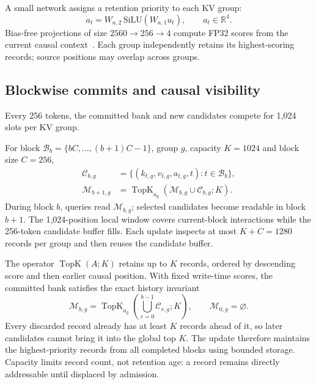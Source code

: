 A small network assigns a retention priority to each KV group:
\begin{equation}
a_t = W_{a,2}\,\mathrm{SiLU}(W_{a,1}u_t),\qquad a_t\in\mathbb R^4.
\end{equation}
Bias-free projections of size $2560\!\rightarrow\!256\!\rightarrow\!4$ compute FP32 scores from the current causal context~\cite{yanchorcode,yanchorconfig}. Each group independently retains its highest-scoring records; source positions may overlap across groups.

\subsection{Blockwise commits and causal visibility}

Every 256 tokens, the committed bank and new candidates compete for 1,024 slots per KV group.

For block $\mathcal B_b=\{bC,\ldots,(b+1)C-1\}$, group $g$, capacity $K=1024$ and block size $C=256$,
\begin{align}
\mathcal C_{b,g}&=\{(k_{t,g},v_{t,g},a_{t,g},t):t\in\mathcal B_b\},\\
\mathcal M_{b+1,g}&=\operatorname{TopK}_{a_g}(\mathcal M_{b,g}\cup\mathcal C_{b,g};K).
\end{align}
During block $b$, queries read $\mathcal M_{b,g}$; selected candidates become readable in block $b+1$. The 1,024-position local window covers current-block interactions while the 256-token candidate buffer fills. Each update inspects at most $K+C=1280$ records per group and then reuses the candidate buffer.

The operator $\operatorname{TopK}(A;K)$ retains up to $K$ records, ordered by descending score and then earlier causal position. With fixed write-time scores, the committed bank satisfies the exact history invariant
\begin{equation}
\mathcal M_{b,g}=\operatorname{TopK}_{a_g}\!\left(\bigcup_{r=0}^{b-1}\mathcal C_{r,g};K\right),
\qquad \mathcal M_{0,g}=\varnothing.
\label{eq:history-topk}
\end{equation}
Every discarded record already has at least $K$ records ahead of it, so later candidates cannot bring it into the global top $K$. The update therefore maintains the highest-priority records from all completed blocks using bounded storage. Capacity limits record count, not retention age: a record remains directly addressable until displaced by admission.

